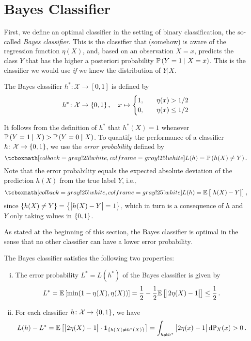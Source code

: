 \section{Bayes Classifier}

First, we define an optimal classifier in the setting of binary classification, the so-called \emph{Bayes classifier}. This is the classifier that (somehow) is aware of the regression function $\eta(X)$, and, based on an observation $X = x$, predicts the class $Y$ that has the higher a posteriori probability $\mathbb{P}\left(Y = 1 \mathrel{|} X = x\right)$. This is the classifier we would use \emph{if} we knew the distribution of $Y \vert X$.

\begin{definition}
The Bayes classifier $h^* \colon \mathcal{X} \to [0,1]$ is defined by
\[
    h^* \colon \mathcal{X} \to \left\{0, 1\right\}, \quad x \mapsto \begin{cases}
    1, \quad &\eta(x) > 1/2 \\
    0, \quad &\eta(x) \leq 1/2
    \end{cases}
\]
\end{definition}

It follows from the definition of $h^*$ that $h^*(X) = 1$ whenever $\mathbb{P}\left(Y = 1 \mathrel{|} X\right) > \mathbb{P}\left(Y = 0 \mathrel{|} X\right)$. To quantify the performance of a classifier $h \colon \mathcal{X} \to \left\{0, 1\right\}$, we use the \emph{error probability} defined by
\[
    \highlightMath{
        L(h) = \Pr{h(X) \neq Y}.
    }
\]
Note that the error probability equals the expected absolute deviation of the prediction $h(X)$ from the true label $Y$, i.e.,
\[
    \highlightMath{
        L(h) = \Ex{\bigAbs{ h(X) - Y }},
    }
\]
since $\left\{h(X) \neq Y\right\} = \left\{\big\lvert h(X) - Y \big\rvert = 1\right\}$, which in turn is a consequence of $h$ and $Y$ only taking values in $\left\{0, 1\right\}$.

As stated at the beginning of this section, the Bayes classifier is optimal in the sense that no other classifier can have a lower error probability.

\begin{theorem}
\label{thm: bayes classifier}
The Bayes classifier satisfies the following two properties:
\begin{enumerate}[(i)]
    \item The error probability $L^* = L(h^*)$ of the Bayes classifier is given by
        \begin{equation}
            \label{eq: bayes error}
            L^* = \mathbb{E}\left[\min(1 - \eta(X), \eta(X))\right] = \frac{1}{2} - \frac{1}{2} \mathbb{E}\left[\big\lvert 2\eta(X) - 1 \big\rvert\right] \leq \frac{1}{2} \, .
        \end{equation}

    \item For each classifier $h \colon \mathcal{X} \to \left\{0, 1\right\}$, we have
        \begin{equation}
            \label{eq: excess risk}
            L(h) - L^* = \mathbb{E}\left[\big\lvert 2\eta(X) - 1 \big\rvert \cdot \mathbf{1}_{\left\{h(X) \neq h^*(X)\right\}}\right] = \int_{h \neq h^*} \big\lvert 2\eta(x) - 1 \big\rvert\,\mathrm{d}\mathbb{P}_{X}(x) > 0 \, .
        \end{equation}
\end{enumerate}
\end{theorem}

